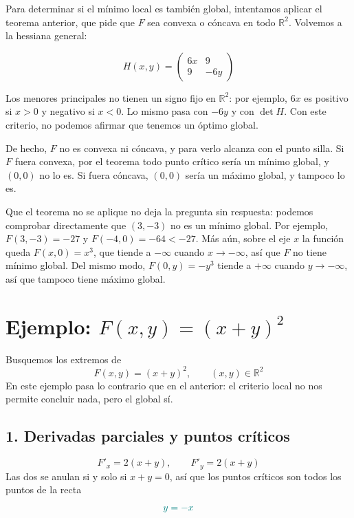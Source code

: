 \documentclass{article}
\newcommand{\R}{\ensuremath{\mathbb{R}}}
\begin{document}
Para determinar si el mínimo local es también global, intentamos aplicar el teorema anterior, que pide que \(F\) sea convexa o cóncava en todo \(\R^2\). Volvemos a la hessiana general:

\[
H(x,y)
=
\begin{pmatrix}
6x & 9\\[4pt]
9  & -6y
\end{pmatrix}
\]

Los menores principales no tienen un signo fijo en \(\R^2\): por ejemplo, \(6x\) es positivo si \(x>0\) y negativo si \(x<0\). Lo mismo pasa con \(-6y\) y con \(\det H\). Con este criterio, no podemos afirmar que tenemos un óptimo global.

De hecho, \(F\) no es convexa ni cóncava, y para verlo alcanza con el punto silla. Si \(F\) fuera convexa, por el teorema todo punto crítico sería un mínimo global, y \((0,0)\) no lo es. Si fuera cóncava, \((0,0)\) sería un máximo global, y tampoco lo es.

Que el teorema no se aplique no deja la pregunta sin respuesta: podemos comprobar directamente que \((3,-3)\) no es un mínimo global. Por ejemplo, \(F(3,-3)=-27\) y \(F(-4,0)=-64<-27\). Más aún, sobre el eje \(x\) la función queda \(F(x,0)=x^3\), que tiende a \(-\infty\) cuando \(x\to-\infty\), así que \(F\) no tiene mínimo global. Del mismo modo, \(F(0,y)=-y^3\) tiende a \(+\infty\) cuando \(y\to-\infty\), así que tampoco tiene máximo global.

\medskip




\section*{Ejemplo: \(F(x,y)=(x+y)^2\)}

Busquemos los extremos de
\[
F(x,y)=(x+y)^2,\qquad (x,y)\in\R^2
\]
En este ejemplo pasa lo contrario que en el anterior: el criterio local no nos permite concluir nada, pero el global sí.

\subsection*{1. Derivadas parciales y puntos críticos}

\[
F'_x=2(x+y),\qquad F'_y=2(x+y)
\]
Las dos se anulan si y solo si \(x+y=0\), así que los puntos críticos son todos los puntos de la recta
\[\color{teal}
y=-x
\]
\end{document}
